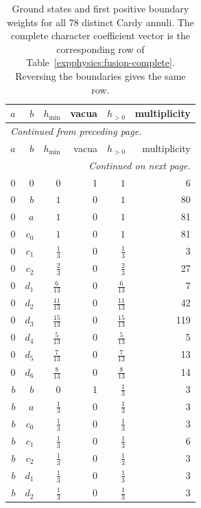 \begingroup\small
\setlength{\tabcolsep}{5pt}
\begin{longtable}{rrrrrr}
\caption{Ground states and first positive boundary weights for all 78 distinct Cardy annuli. The complete character coefficient vector is the corresponding row of Table~\ref{expphysics:fusion-complete}. Reversing the boundaries gives the same row.}\label{expphysics:cardy-gaps}\\
\toprule
$a$ & $b$ & $h_{\min}$ & vacua & $h_{>0}$ & multiplicity\\
\midrule
\endfirsthead
\multicolumn{6}{l}{\small\itshape Continued from preceding page.}\\
\toprule
$a$ & $b$ & $h_{\min}$ & vacua & $h_{>0}$ & multiplicity\\
\midrule
\endhead
\midrule
\multicolumn{6}{r}{\small\itshape Continued on next page.}\\
\endfoot
\bottomrule
\endlastfoot
$0$ & $0$ & $0$ & 1 & $1$ & 6\\
$0$ & $b$ & $1$ & 0 & $1$ & 80\\
$0$ & $a$ & $1$ & 0 & $1$ & 81\\
$0$ & $c_{0}$ & $1$ & 0 & $1$ & 81\\
$0$ & $c_{1}$ & $\frac{1}{3}$ & 0 & $\frac{1}{3}$ & 3\\
$0$ & $c_{2}$ & $\frac{2}{3}$ & 0 & $\frac{2}{3}$ & 27\\
$0$ & $d_{1}$ & $\frac{6}{13}$ & 0 & $\frac{6}{13}$ & 7\\
$0$ & $d_{2}$ & $\frac{11}{13}$ & 0 & $\frac{11}{13}$ & 42\\
$0$ & $d_{3}$ & $\frac{15}{13}$ & 0 & $\frac{15}{13}$ & 119\\
$0$ & $d_{4}$ & $\frac{5}{13}$ & 0 & $\frac{5}{13}$ & 5\\
$0$ & $d_{5}$ & $\frac{7}{13}$ & 0 & $\frac{7}{13}$ & 13\\
$0$ & $d_{6}$ & $\frac{8}{13}$ & 0 & $\frac{8}{13}$ & 14\\
$b$ & $b$ & $0$ & 1 & $\frac{1}{3}$ & 3\\
$b$ & $a$ & $\frac{1}{3}$ & 0 & $\frac{1}{3}$ & 3\\
$b$ & $c_{0}$ & $\frac{1}{3}$ & 0 & $\frac{1}{3}$ & 3\\
$b$ & $c_{1}$ & $\frac{1}{3}$ & 0 & $\frac{1}{3}$ & 6\\
$b$ & $c_{2}$ & $\frac{1}{3}$ & 0 & $\frac{1}{3}$ & 3\\
$b$ & $d_{1}$ & $\frac{1}{3}$ & 0 & $\frac{1}{3}$ & 3\\
$b$ & $d_{2}$ & $\frac{1}{3}$ & 0 & $\frac{1}{3}$ & 3\\

\end{longtable}
